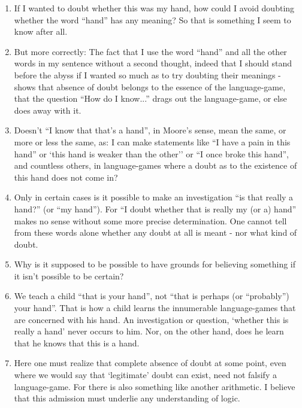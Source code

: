 \documentclass{book}
\begin{document}
\begin{enumerate}
\item
If I wanted to doubt whether this was my hand, how could I avoid doubting
whether the word ``hand'' has any meaning? So that is something I seem to know
after all.

\item
But more correctly: The fact that I use the word ``hand'' and all the other
words in my sentence without a second thought, indeed that I should stand
before the abyss if I wanted so much as to try doubting their meanings - shows
that absence of doubt belongs to the essence of the language-game, that the
question ``How do I know...'' drags out the language-game, or else does away
with it.

\item
Doesn't ``I know that that's a hand'', in Moore's sense, mean the same, or more
or less the same, as: I can make statements like ``I have a pain in this hand''
or `this hand is weaker than the other'' or ``I once broke this hand'', and
countless others, in language-games where a doubt as to the existence of this
hand does not come in?

\item
Only in certain cases is it possible to make an investigation ``is that really
a hand?'' (or ``my hand''). For ``I doubt whether that is really my (or a)
hand'' makes no sense without some more precise determination. One cannot tell
from these words alone whether any doubt at all is meant - nor what kind of
doubt.

\item
Why is it supposed to be possible to have grounds for believing something if it
isn't possible to be certain?

\item
We teach a child ``that is your hand'', not ``that is perhaps (or ``probably'')
your hand''. That is how a child learns the innumerable language-games that are
concerned with his hand. An investigation or question, `whether this is really
a hand' never occurs to him. Nor, on the other hand, does he learn that he
knows that this is a hand.

\item
Here one must realize that complete absence of doubt at some point, even where
we would say that `legitimate' doubt can exist, need not falsify a
language-game. For there is also something like another arithmetic.  I believe
that this admission must underlie any understanding of logic.


\end{enumerate}
\end{document}

